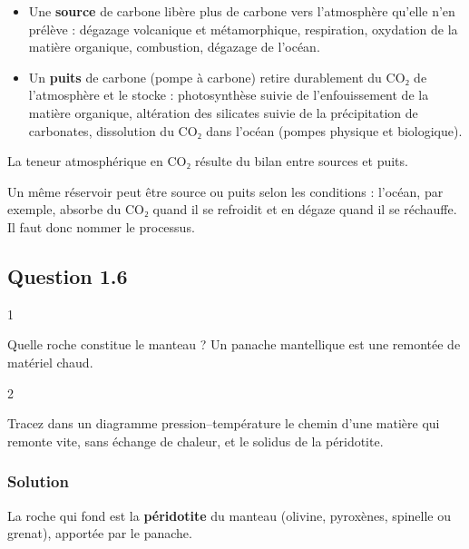 \documentclass[11pt,a4paper]{article}
\providecommand{\tightlist}{\setlength{\itemsep}{0pt}\setlength{\parskip}{0pt}}
\begin{document}
\begin{itemize}
\tightlist
\item
  Une \textbf{source} de carbone libère plus de carbone vers l'atmosphère qu'elle n'en prélève : dégazage volcanique et métamorphique, respiration, oxydation de la matière organique, combustion, dégazage de l'océan.
\item
  Un \textbf{puits} de carbone (pompe à carbone) retire durablement du CO₂ de l'atmosphère et le stocke : photosynthèse suivie de l'enfouissement de la matière organique, altération des silicates suivie de la précipitation de carbonates, dissolution du CO₂ dans l'océan (pompes physique et biologique).
\end{itemize}

La teneur atmosphérique en CO₂ résulte du bilan entre sources et puits.

\begin{piege}

Un même réservoir peut être source ou puits selon les conditions : l'océan, par exemple, absorbe du CO₂ quand il se refroidit et en dégaze quand il se réchauffe. Il faut donc nommer le processus.

\end{piege}

\hypertarget{question-1.6}{%
\subsection{Question 1.6}\label{question-1.6}}

\begin{indication}{1}

Quelle roche constitue le manteau ? Un panache mantellique est une remontée de matériel chaud.

\end{indication}

\begin{indication}{2}

Tracez dans un diagramme pression--température le chemin d'une matière qui remonte vite, sans échange de chaleur, et le solidus de la péridotite.

\end{indication}

\hypertarget{solution-5}{%
\subsubsection{Solution}\label{solution-5}}

La roche qui fond est la \textbf{péridotite} du manteau (olivine, pyroxènes, spinelle ou grenat), apportée par le panache.
\end{document}
